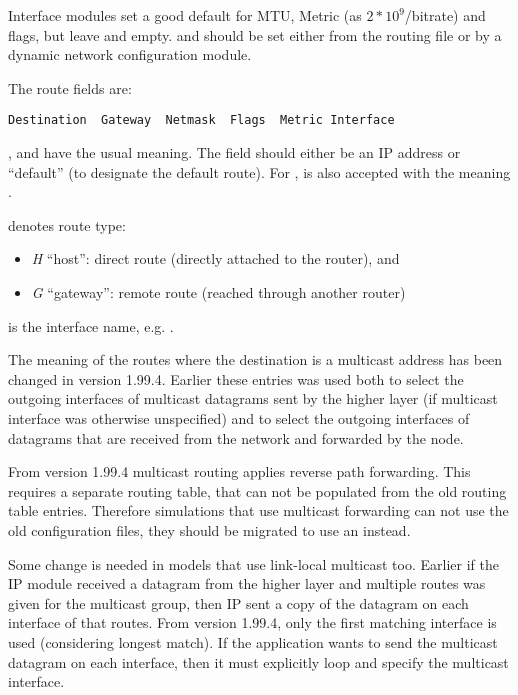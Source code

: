 Interface modules set a good default for MTU, Metric (as $2*10^9$/bitrate) and
flags, but leave  and  empty.  and
 should be set either from the routing file or by a dynamic network
configuration module.

The route fields are:

\begin{verbatim}
Destination  Gateway  Netmask  Flags  Metric Interface
\end{verbatim}

,  and  have the usual meaning.
The  field should either be an IP address or ``default''
(to designate the default route). For , \ttt{*} is also
accepted with the meaning .

 denotes route type:

\begin{itemize}
  \item \textit{H} ``host'': direct route (directly attached to the router), and
  \item \textit{G} ``gateway'': remote route (reached through another router)
\end{itemize}

 is the interface name, e.g. .

\begin{important}
The meaning of the routes where the destination is a multicast address
has been changed in version 1.99.4. Earlier these entries was used
both to select the outgoing interfaces of multicast datagrams
sent by the higher layer (if multicast interface was otherwise unspecified)
and to select the outgoing interfaces of datagrams that are received from
the network and forwarded by the node.

From version 1.99.4 multicast routing applies reverse path forwarding.
This requires a separate routing table, that can not be populated from
the old routing table entries. Therefore simulations that use multicast
forwarding can not use the old configuration files, they should be
migrated to use an  instead.

Some change is needed in models that use link-local multicast too.
Earlier if the IP module received a datagram from the higher layer
and multiple routes was given for the multicast group,
then IP sent a copy of the datagram on each interface of that routes.
From version 1.99.4, only the first matching interface is used (considering
longest match). If the application wants to send the multicast datagram
on each interface, then it must explicitly loop and specify the multicast
interface.  
\end{important}

